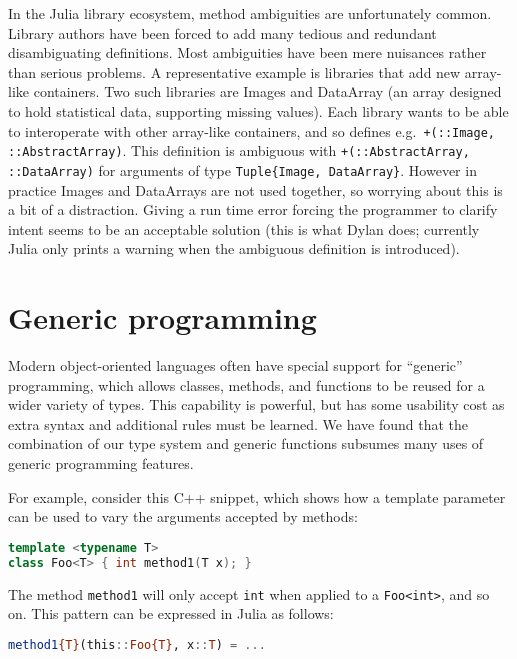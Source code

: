 In the Julia library ecosystem, method ambiguities are unfortunately
common.
Library authors have been forced to add many tedious and redundant
disambiguating definitions.
Most ambiguities have been mere nuisances rather than serious
problems.
A representative example is libraries that add new array-like
containers.
Two such libraries are Images and DataArray (an array designed to
hold statistical data, supporting missing values).
Each library wants to be able to interoperate with other array-like
containers, and so defines e.g.\ \texttt{+(::Image, ::AbstractArray)}.
This definition is ambiguous with \texttt{+(::AbstractArray, ::DataArray)}
for arguments of type \texttt{Tuple\{Image, DataArray\}}.
However in practice Images and DataArrays are not used together, so
worrying about this is a bit of a distraction.
Giving a run time error forcing the programmer to clarify intent
seems to be an acceptable solution (this is what Dylan does;
currently Julia only prints a warning when the ambiguous definition
is introduced).

\section{Generic programming}

Modern object-oriented languages often have special support for ``generic''
programming, which allows classes, methods, and functions to be reused
for a wider variety of types.
This capability is powerful, but has some usability cost as extra
syntax and additional rules must be learned.
We have found that the combination of our type system and generic functions
subsumes many uses of generic programming features.

For example, consider this C++ snippet, which shows how a template
parameter can be used to vary the arguments accepted by methods:

\begin{singlespace}
\begin{lstlisting}[language=c++,style=ttcode]
template <typename T>
class Foo<T> { int method1(T x); }
\end{lstlisting}
\end{singlespace}

\noindent
The method \texttt{method1} will only accept \texttt{int} when applied to
a \texttt{Foo<int>}, and so on.
This pattern can be expressed in Julia as follows:

\begin{singlespace}
\begin{lstlisting}[language=julia]
method1{T}(this::Foo{T}, x::T) = ...
\end{lstlisting}
\end{singlespace}

